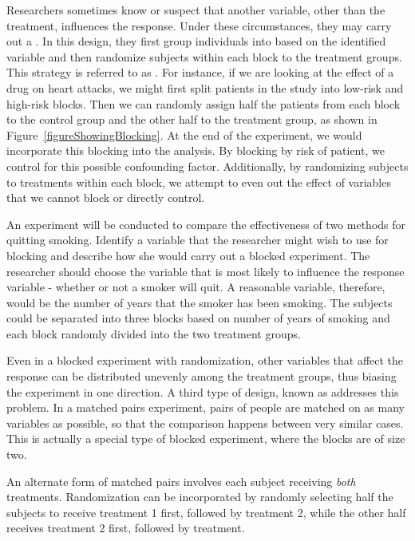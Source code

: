 Researchers sometimes know or suspect that another variable, other than the treatment, influences the response. Under these circumstances, they may carry out a . In this design, they first group individuals into  based on the identified variable and then randomize subjects within each block to the treatment groups. This strategy is referred to as . For instance, if we are looking at the effect of a drug on heart attacks, we might first split patients in the study into low-risk and high-risk blocks. Then we can randomly assign half the patients from each block to the control group and the other half to the treatment group, as shown in Figure~\ref{figureShowingBlocking}. At the end of the experiment, we would incorporate this blocking into the analysis. By blocking by risk of patient, we control for this possible confounding factor. Additionally, by randomizing subjects to treatments within each block, we attempt to even out the effect of variables that we cannot block or directly control.

\begin{examplewrap}
\begin{nexample}{An experiment will be conducted to compare the effectiveness of two methods for quitting smoking. Identify a variable that the researcher might wish to use for blocking and describe how she would carry out a blocked experiment.}
The researcher should choose the variable that is most likely to influence the response variable - whether or not a smoker will quit. A reasonable variable, therefore, would be the number of years that the smoker has been smoking. The subjects could be separated into three blocks based on number of years of smoking and each block randomly divided into the two treatment groups.
\end{nexample}
\end{examplewrap}

\D{\newpage}

Even in a blocked experiment with randomization, other variables that affect the response can be distributed unevenly among the treatment groups, thus biasing the experiment in one direction. A third type of design, known as  addresses this problem. In a matched pairs experiment, pairs of people are matched on as many variables as possible, so that the comparison happens between very similar cases. This is actually a special type of blocked experiment, where the blocks are of size two.

An alternate form of matched pairs involves each subject receiving \emph{both} treatments. Randomization can be incorporated by randomly selecting half the subjects to receive treatment 1 first, followed by treatment 2, while the other half receives treatment 2 first, followed by treatment.

